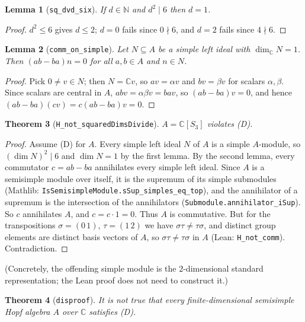 \documentclass[11pt]{article}
\newtheorem{theorem}{Theorem}
\newtheorem{lemma}[theorem]{Lemma}
\theoremstyle{definition}
\begin{document}
\begin{lemma}[\texttt{sq\_dvd\_six}]
If $d\in\mathbb{N}$ and $d^2\mid 6$ then $d=1$.
\end{lemma}
\begin{proof}
$d^2\le 6$ gives $d\le 2$; $d=0$ fails since $0\nmid 6$, and $d=2$ fails since $4\nmid 6$.
\end{proof}

\begin{lemma}[\texttt{comm\_on\_simple}]
Let $N\subseteq A$ be a simple left ideal with $\dim_{\mathbb{C}}N=1$. Then
$(ab-ba)n=0$ for all $a,b\in A$ and $n\in N$.
\end{lemma}
\begin{proof}
Pick $0\neq v\in N$; then $N=\mathbb{C}v$, so $av=\alpha v$ and $bv=\beta v$ for scalars
$\alpha,\beta$. Since scalars are central in $A$, $abv=\alpha\beta v=bav$, so $(ab-ba)v=0$, and
hence $(ab-ba)(cv)=c(ab-ba)v=0$.
\end{proof}

\begin{theorem}[\texttt{H\_not\_squaredDimsDivide}]
$A=\mathbb{C}[S_3]$ violates (D).
\end{theorem}
\begin{proof}
Assume (D) for $A$. Every simple left ideal $N$ of $A$ is a simple $A$-module, so
$(\dim N)^2\mid 6$ and $\dim N=1$ by the first lemma. By the second lemma, every commutator
$c=ab-ba$ annihilates every simple left ideal. Since $A$ is a semisimple module over itself, it is
the supremum of its simple submodules (Mathlib: \texttt{IsSemisimpleModule.sSup\_simples\_eq\_top}),
and the annihilator of a supremum is the intersection of the annihilators
(\texttt{Submodule.annihilator\_iSup}). So $c$ annihilates $A$, and $c=c\cdot 1=0$. Thus $A$ is
commutative. But for the transpositions $\sigma=(0\,1)$, $\tau=(1\,2)$ we have
$\sigma\tau\neq\tau\sigma$, and distinct group elements are distinct basis vectors of $A$, so
$\sigma\tau\neq\tau\sigma$ in $A$ (Lean: \texttt{H\_not\_comm}). Contradiction.
\end{proof}
(Concretely, the offending simple module is the $2$-dimensional standard representation; the Lean
proof does not need to construct it.)

\begin{theorem}[\texttt{disproof}]
It is not true that every finite-dimensional semisimple Hopf algebra $A$ over $\mathbb{C}$
satisfies (D).
\end{theorem}
\end{document}
